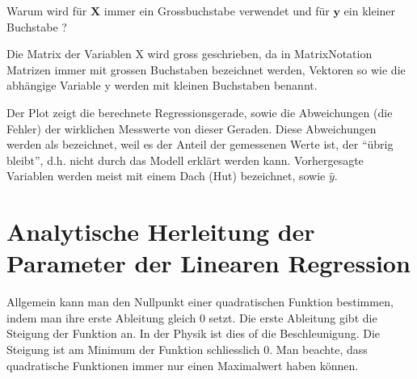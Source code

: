 \documentclass[letterpaper,10pt,english]{jupyterBook}
\begin{document}
\begin{sphinxVerbatim}[commandchars=\\\{\}]
   
   
   
  
  
  
 
      
\end{sphinxVerbatim}

\sphinxAtStartPar
Warum wird für \(\mathbf{X}\) immer ein Grossbuchstabe verwendet und für \(\mathbf{y}\) ein kleiner Buchstabe ?

\sphinxAtStartPar
Die Matrix der Variablen X wird gross geschrieben, da in Matrix\sphinxhyphen{}Notation Matrizen immer mit grossen Buchstaben bezeichnet werden, Vektoren \sphinxhyphen{} so wie die abhängige Variable y \sphinxhyphen{} werden mit kleinen Buchstaben benannt.

\noindent{}

\sphinxAtStartPar
Der Plot zeigt die berechnete Regressionsgerade, sowie die Abweichungen (die Fehler) der wirklichen Messwerte von dieser Geraden. Diese Abweichungen werden als  bezeichnet, weil es der Anteil der gemessenen Werte ist, der “übrig bleibt”, d.h. nicht durch das Modell erklärt werden kann. Vorhergesagte Variablen werden meist mit einem Dach (Hut) bezeichnet, sowie \(\hat{y}\).


\chapter{Analytische Herleitung der Parameter der Linearen Regression}
\label{\detokenize{Regression_Techniques:analytische-herleitung-der-parameter-der-linearen-regression}}
\sphinxAtStartPar
Allgemein kann man den Nullpunkt einer quadratischen Funktion bestimmen, indem man ihre erste Ableitung gleich \(0\) setzt. Die erste Ableitung gibt die Steigung der Funktion an. In der Physik ist dies of die Beschleunigung. Die Steigung ist am Minimum der Funktion schliesslich \(0\). Man beachte, dass quadratische Funktionen immer nur einen Maximalwert haben können.
\end{document}
